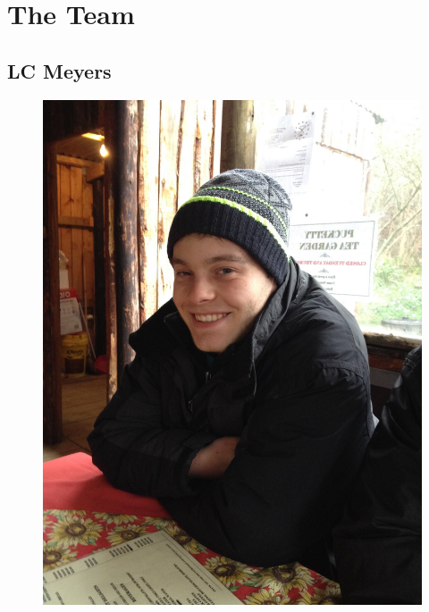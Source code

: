 \documentclass{article}
\begin{document}
	\section{The Team}
	\subsection{LC Meyers}
	\begin{figure}[h]
		\centering
		\includegraphics[height=0.3\textheight]{../charl.jpg}
	\end{figure}
\end{document}
